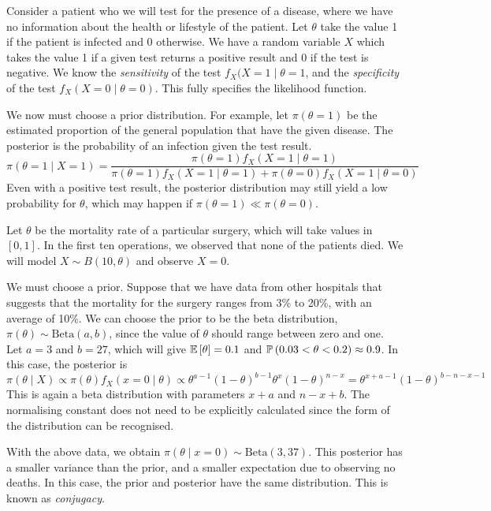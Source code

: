 \begin{example}
	Consider a patient who we will test for the presence of a disease, where we have no information about the health or lifestyle of the patient.
	Let \( \theta \) take the value 1 if the patient is infected and 0 otherwise.
	We have a random variable \( X \) which takes the value 1 if a given test returns a positive result and 0 if the test is negative.
	We know the \textit{sensitivity} of the test \( f_X(X=1\mid \theta=1 \), and the \textit{specificity} of the test \( f_X(X=0\mid \theta=0) \).
	This fully specifies the likelihood function.

	We now must choose a prior distribution.
	For example, let \( \pi(\theta = 1) \) be the estimated proportion of the general population that have the given disease.
	The posterior is the probability of an infection given the test result.
	\[
		\pi(\theta = 1 \mid X = 1) = \frac{\pi(\theta = 1) f_X(X = 1 \mid \theta = 1)}{\pi(\theta = 1) f_X(X = 1 \mid \theta = 1) + \pi(\theta = 0) f_X(X = 1 \mid \theta = 0)}
	\]
	Even with a positive test result, the posterior distribution may still yield a low probability for \( \theta \), which may happen if \( \pi(\theta = 1) \ll \pi(\theta = 0) \).
\end{example}
\begin{example}
	Let \( \theta \) be the mortality rate of a particular surgery, which will take values in \( [0,1] \).
	In the first ten operations, we observed that none of the patients died.
	We will model \( X \sim B(10,\theta) \) and observe \( X = 0 \).

	We must choose a prior.
	Suppose that we have data from other hospitals that suggests that the mortality for the surgery ranges from 3\% to 20\%, with an average of 10\%.
	We can choose the prior to be the beta distribution, \( \pi(\theta) \sim \mathrm{Beta}(a,b) \), since the value of \( \theta \) should range between zero and one.
	Let \( a = 3 \) and \( b = 27 \), which will give \( \mathbb{E}\left[{\theta}\right] = 0.1 \) and \( \mathbb{P}\left({0.03 < \theta < 0.2}\right) \approx 0.9 \).
	In this case, the posterior is
	\[
		\pi(\theta \mid X) \propto \pi(\theta) f_X(x = 0 \mid \theta) \propto \theta^{a-1} (1-\theta)^{b-1} \theta^x (1-\theta)^{n-x} = \theta^{x+a-1} (1-\theta)^{b-n-x-1}
	\]
	This is again a beta distribution with parameters \( x+a \) and \( n-x+b \).
	The normalising constant does not need to be explicitly calculated since the form of the distribution can be recognised.

	With the above data, we obtain \( \pi(\theta \mid x = 0) \sim \mathrm{Beta}(3,37) \).
	This posterior has a smaller variance than the prior, and a smaller expectation due to observing no deaths.
	In this case, the prior and posterior have the same distribution.
	This is known as \textit{conjugacy}.
\end{example}

